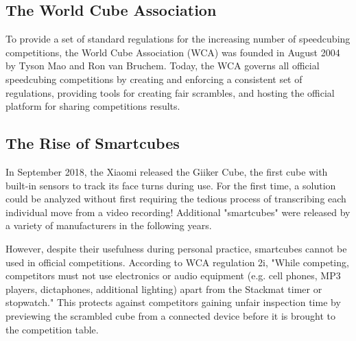 \subsection{The World Cube Association}
\label{subsec:the-world-cube-association}

To provide a set of standard regulations for the increasing number of
speedcubing competitions, the World Cube Association (WCA) was founded
in August 2004 by Tyson Mao and Ron van Bruchem. Today, the WCA governs
all official speedcubing competitions by creating and enforcing a
consistent set of regulations, providing tools for creating fair
scrambles, and hosting the official platform for sharing competitions
results. \cite{wca-speedcubing-history}

\subsection{The Rise of Smartcubes}
\label{subsec:the-rise-of-smart-cubes}

In September 2018, the Xiaomi released the Giiker Cube, the first cube
with built-in sensors to track its face turns during use.
\cite{giiker-thecubicle} For the first time, a solution could be
analyzed without first requiring the tedious process of transcribing
each individual move from a video recording! Additional "smartcubes"
were released by a variety of manufacturers in the following years.
\cite{gocube-product-launch-video} \cite{gans356i-thecubicle}
\cite{gocube-rubiksconnected}

However, despite their usefulness during personal practice, smartcubes
cannot be used in official competitions. According to WCA regulation
2i, "While competing, competitors must not use electronics or audio
equipment (e.g. cell phones, MP3 players, dictaphones, additional
lighting) apart from the Stackmat timer or stopwatch."
\cite{wca-regulations} This protects against competitors gaining unfair
inspection time by previewing the scrambled cube from a connected
device before it is brought to the competition table.
